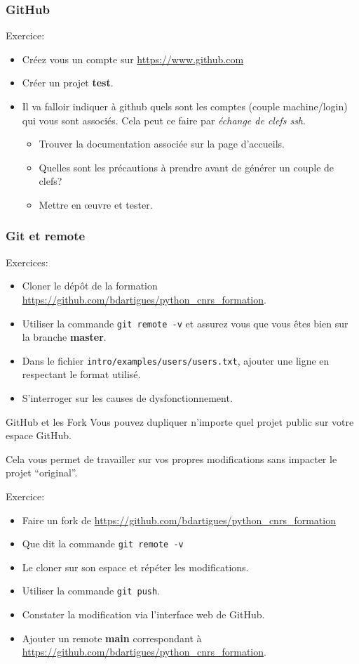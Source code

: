 \documentclass{beamer}
\begin{document}
\begin{frame}[fragile]\frametitle{GitHub}
  
  Exercice:
  \begin{itemize}
  \item Créez vous un compte sur \url{https://www.github.com}
  \item Créer un projet {\bf test}.
  \item Il va falloir indiquer à github quels sont les comptes (couple machine/login) qui vous sont associés. Cela peut ce faire par {\em échange de clefs ssh}. 
    \begin{itemize}
    \item Trouver la documentation associée sur la page d'accueils.
    \item Quelles sont les précautions à prendre avant de générer un couple de clefs?
    \item Mettre en œuvre et tester.
    \end{itemize}
  \end{itemize}
\end{frame}

\begin{frame}[fragile]\frametitle{Git et remote}
  Exercices: 
  \begin{itemize}
  \item Cloner le dépôt de la formation \url{https://github.com/bdartigues/python_cnrs_formation}.
  \item Utiliser la commande {\tt git remote -v} et assurez vous que vous êtes bien sur la branche {\bf master}.
  \item Dans le fichier {\tt intro/examples/users/users.txt}, ajouter une ligne en respectant le format utilisé.
  \item S'interroger sur les causes de dysfonctionnement.
  \end{itemize}
\end{frame}

\begin{frame}{GitHub et les Fork}
  Vous pouvez dupliquer n'importe quel projet public sur votre espace GitHub.
  
  Cela vous permet de travailler sur vos propres modifications sans impacter le projet ``original''.

  Exercice:
  \begin{itemize}
  \item Faire un fork de \url{https://github.com/bdartigues/python_cnrs_formation}
  \item Que dit la commande {\tt git remote -v}
  \item Le cloner sur son espace et répéter les modifications.
  \item Utiliser la commande {\tt git push}.
  \item Constater la modification via l'interface web de GitHub.
  \item Ajouter un remote {\bf main} correspondant à \url{https://github.com/bdartigues/python_cnrs_formation}.
  \end{itemize}
\end{frame}
\end{document}
